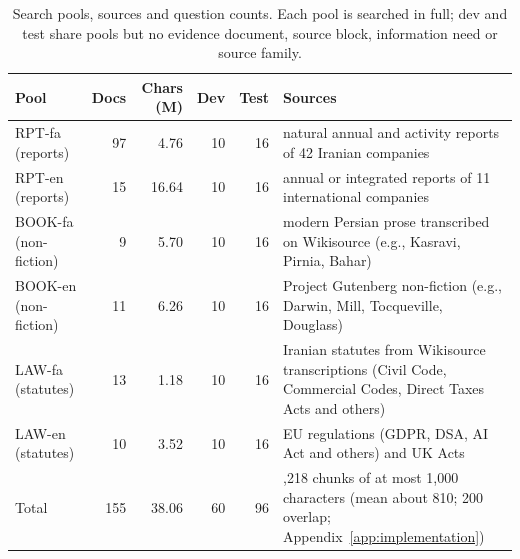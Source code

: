 \begin{table}[t]
\centering
\small
\begin{tabularx}{\textwidth}{@{}lrrrr>{\raggedright\arraybackslash}X@{}}
\toprule
Pool & Docs & Chars (M) & Dev & Test & Sources \\
\midrule
RPT-fa (reports) & 97 & 4.76 & 10 & 16 & natural annual and activity reports of 42 Iranian companies \\
RPT-en (reports) & 15 & 16.64 & 10 & 16 & annual or integrated reports of 11 international companies \\
BOOK-fa (non-fiction) & 9 & 5.70 & 10 & 16 & modern Persian prose transcribed on Wikisource (e.g., Kasravi, Pirnia, Bahar) \\
BOOK-en (non-fiction) & 11 & 6.26 & 10 & 16 & Project Gutenberg non-fiction (e.g., Darwin, Mill, Tocqueville, Douglass) \\
LAW-fa (statutes) & 13 & 1.18 & 10 & 16 & Iranian statutes from Wikisource transcriptions (Civil Code, Commercial Codes, Direct Taxes Acts and others) \\
LAW-en (statutes) & 10 & 3.52 & 10 & 16 & EU regulations (GDPR, DSA, AI Act and others) and UK Acts \\
\midrule
Total & 155 & 38.06 & 60 & 96 & 58,218 chunks of at most 1,000 characters (mean about 810; 200 overlap; Appendix~\ref{app:implementation}) \\
\bottomrule
\end{tabularx}
\caption{Search pools, sources and question counts. Each pool is searched in full; dev and test share pools but no evidence document, source block, information need or source family.}
\label{tab:pools}
\end{table}
